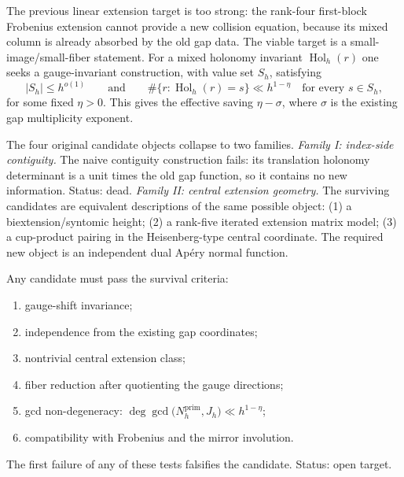 \begin{remark}
\label{rem:sh-mixed-return}
The previous linear extension target is too strong: the rank-four
first-block Frobenius extension cannot provide a new collision
equation, because its mixed column is already absorbed by the old gap
data.  The viable target is a small-image/small-fiber statement.  For a
mixed holonomy invariant $\operatorname{Hol}_h(r)$ one seeks a
gauge-invariant construction, with value set $S_h$, satisfying
\[
 |S_h|\le h^{o(1)}
 \qquad\text{and}\qquad
 \#\{r:\operatorname{Hol}_h(r)=s\}\ll h^{1-\eta}
 \quad\text{for every }s\in S_h,
\]
for some fixed $\eta>0$.  This gives the effective saving
$\eta-\sigma$, where $\sigma$ is the existing gap multiplicity
exponent.

The four original candidate objects collapse to two families.
\emph{Family I: index-side contiguity.}  The naive contiguity
construction fails: its translation holonomy determinant is a unit
times the old gap function, so it contains no new information.  Status:
dead.
\emph{Family II: central extension geometry.}  The surviving candidates
are equivalent descriptions of the same possible object:
(1) a biextension/syntomic height; (2) a rank-five iterated extension
matrix model; (3) a cup-product pairing in the Heisenberg-type central
coordinate.  The required new object is an independent dual Ap\'ery
normal function.

Any candidate must pass the survival criteria:
\begin{enumerate}
\item[S1.] gauge-shift invariance;
\item[S2.] independence from the existing gap coordinates;
\item[S3.] nontrivial central extension class;
\item[S4.] fiber reduction after quotienting the gauge directions;
\item[S5.] gcd non-degeneracy:
 $\deg\gcd\bigl(N_h^{\mathrm{prim}},J_h\bigr)\ll h^{1-\eta}$;
\item[S6.] compatibility with Frobenius and the mirror involution.
\end{enumerate}
The first failure of any of these tests falsifies the candidate.
Status: open target.
\end{remark}

